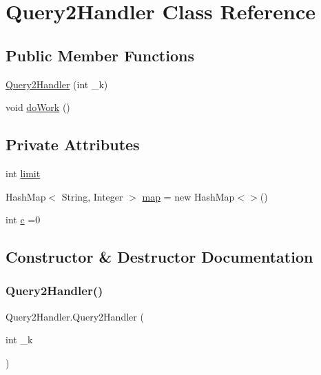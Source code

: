 \hypertarget{class_query2_handler}{}\section{Query2\+Handler Class Reference}
\label{class_query2_handler}
\subsection*{Public Member Functions}
\begin{DoxyCompactItemize}
\item 
\hyperlink{class_query2_handler_ac7924cedf070f4258238fa8cefa71818}{Query2\+Handler} (int \+\_\+k)
\item 
void \hyperlink{class_query2_handler_a29ff96d28d8af3b389f7a927aa88ef94}{do\+Work} ()
\end{DoxyCompactItemize}
\subsection*{Private Attributes}
\begin{DoxyCompactItemize}
\item 
int \hyperlink{class_query2_handler_a086e6c46abd14506f22fb5d1d623d2b0}{limit}
\item 
Hash\+Map$<$ String, Integer $>$ \hyperlink{class_query2_handler_acf4cc7d926ce0efea12e03974fafda1c}{map} = new Hash\+Map$<$$>$()
\item 
int \hyperlink{class_query2_handler_a12fe19bdbd73d5b13d49f302d2184fa8}{c} =0
\end{DoxyCompactItemize}


\subsection{Constructor \& Destructor Documentation}
\hypertarget{class_query2_handler_ac7924cedf070f4258238fa8cefa71818}{}\label{class_query2_handler_ac7924cedf070f4258238fa8cefa71818} 
\subsubsection{\texorpdfstring{Query2\+Handler()}{Query2Handler()}}
{\footnotesize\ttfamily Query2\+Handler.\+Query2\+Handler (\begin{DoxyParamCaption}\item[{int}]{\+\_\+k }\end{DoxyParamCaption})}



